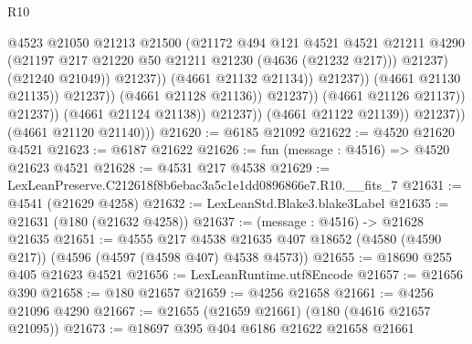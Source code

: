 \begin{lexlean}{R10}
\begin{coremodule}
                                                  @4523
                                                  @21050
                                                  @21213
                                                  @21500
                                                  (@21172
                                                    @494
                                                    @121
                                                    @4521
                                                    @4521
                                                    @21211
                                                    @4290
                                                    (@21197
                                                      @217
                                                      @21220
                                                      @50
                                                      @21211
                                                      @21230
                                                      (@4636 (@21232 @217)))
                                                    @21237)
                                                  (@21240 @21049))
                                                @21237))
                                            (@4661 @21132 @21134))
                                          @21237))
                                      (@4661 @21130 @21135))
                                    @21237))
                                (@4661 @21128 @21136))
                              @21237))
                          (@4661 @21126 @21137))
                        @21237))
                    (@4661 @21124 @21138))
                  @21237))
              (@4661 @21122 @21139))
            @21237))
        (@4661 @21120 @21140)))
@21620 := @6185 @21092
@21622 := @4520 @21620 @4521
@21623 := @6187 @21622
@21626 := fun (message : @4516) => @4520 @21623 @4521
@21628 := @4531 @217 @4538
@21629 := LexLeanPreserve.C212618f8b6ebac3a5c1e1dd0896866e7.R10.__fits_7
@21631 := @4541 (@21629 @4258)
@21632 := LexLeanStd.Blake3.blake3Label
@21635 := @21631 (@180 (@21632 @4258))
@21637 := (message : @4516) -> @21628 @21635
@21651 := @4555
    @217
    @4538
    @21635
    @407
    @18652
    (@4580 (@4590 @217))
    (@4596 (@4597 (@4598 @407) @4538 @4573))
@21655 := @18690 @255 @405 @21623 @4521
@21656 := LexLeanRuntime.utf8Encode
@21657 := @21656 @390
@21658 := @180 @21657
@21659 := @4256 @21658
@21661 := @4256 @21096 @4290
@21667 := @21655 (@21659 @21661) (@180 (@4616 @21657 @21095))
@21673 := @18697 @395 @404 @6186 @21622 @21658 @21661

\end{coremodule}
\end{lexlean}
